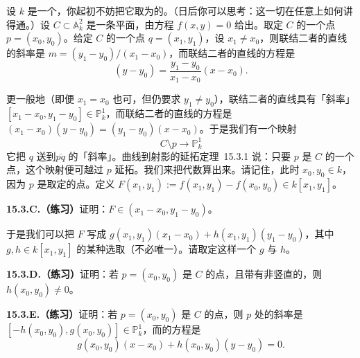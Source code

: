 设 $k$ 是一个\trField，你起初不妨把它取为\trAlgClosed{}的。（日后你可以思考：这一切在任意\trField{}上如何讲得通。）设 $C\subset\mathbb{A}^2_k$ 是一条平面\trCurve，由方程 $f(x,y)=0$ 给出。取定 $C$ 的一个点 $p=(x_0,y_0)$。给定 $C$ 的一个点 $q=(x_1,y_1)$，设 $x_1\ne x_0$，则联结二者的直线的斜率是 $m=(y_1-y_0)/(x_1-x_0)$，而联结二者的直线的方程是
\[
(y-y_0)=\frac{y_1-y_0}{x_1-x_0}(x-x_0).
\]

更一般地（即便 $x_1=x_0$ 也可，但仍要求 $y_1\ne y_0$），联结二者的直线具有「斜率」$[x_1-x_0,y_1-y_0]\in\mathbb{P}^1_k$，而联结二者的直线的方程是 $(x_1-x_0)(y-y_0)=(y_1-y_0)(x-x_0)$。于是我们有一个映射
\begin{equation*}\tag{15.3.4.1}\label{eq:secant-slope-map}
C\setminus p\longrightarrow\mathbb{P}^1_k
\end{equation*}
它把 $q$ 送到\trSecant $\overline{pq}$ 的「斜率」。\mbox{曲线到射影的延拓定理~15.3.1} 说：只要 $p$ 是 $C$ 的一个\trSmooth{}点，这个映射便可越过 $p$ 延拓。我们来把代数算出来。请记住，此时 $x_0,y_0\in k$，因为 $p$ 是取定的点。定义 $F(x_1,y_1):=f(x_1,y_1)-f(x_0,y_0)\in k[x_1,y_1]$。

\textbf{15.3.C.（练习）}\quad 证明：$F\in(x_1-x_0,y_1-y_0)$。

于是我们可以把 $F$ 写成 $g(x_1,y_1)(x_1-x_0)+h(x_1,y_1)(y_1-y_0)$，其中 $g,h\in k[x_1,y_1]$ 的某种选取（不必唯一）。请取定这样一个 $g$ 与 $h$。

\textbf{15.3.D.（练习）}\quad 证明：若 $p=(x_0,y_0)$ 是 $C$ 的\trSmooth{}点，且带有非竖直的\trTangentVector，则 $h(x_0,y_0)\ne 0$。

\textbf{15.3.E.（练习）}\quad 证明：若 $p=(x_0,y_0)$ 是 $C$ 的\trSmooth{}点，则 $p$ 处\trTangentLine{}的斜率是 $[-h(x_0,y_0),g(x_0,y_0)]\in\mathbb{P}^1_k$，而\trTangentLine{}的方程是
\[
g(x_0,y_0)(x-x_0)+h(x_0,y_0)(y-y_0)=0.
\]

